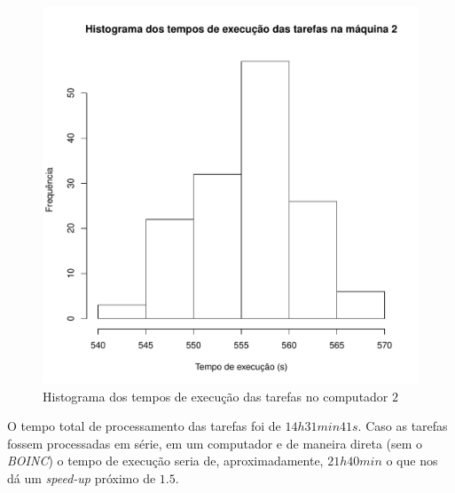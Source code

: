 \begin{figure}[!ht]
	\includegraphics[scale=0.8]{hist2.pdf}

	\caption{Histograma dos tempos de execução das tarefas no computador $2$}
	\label{hist_comp2}	
\end{figure}



O tempo total de processamento das tarefas foi de $14h31min41s$. Caso as tarefas fossem processadas
em série, em um computador e de maneira direta (sem o \emph{BOINC})
o tempo de execução seria de, aproximadamente, $21h40min$ o que nos dá um \emph{speed-up} 
próximo de $1.5$.








